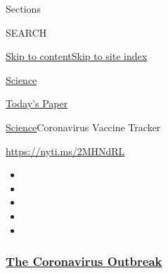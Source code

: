 Sections

SEARCH

\protect\hyperlink{site-content}{Skip to
content}\protect\hyperlink{site-index}{Skip to site index}

\href{https://www.nytimes3xbfgragh.onion/section/science}{Science}

\href{https://myaccount.nytimes3xbfgragh.onion/auth/login?response_type=cookie\&client_id=vi}{}

\href{https://www.nytimes3xbfgragh.onion/section/todayspaper}{Today's
Paper}

\href{/section/science}{Science}\textbar{}Coronavirus Vaccine Tracker

\url{https://nyti.ms/2MHNdRL}

\begin{itemize}
\item
\item
\item
\item
\item
\end{itemize}

\hypertarget{the-coronavirus-outbreak}{%
\subsubsection{\texorpdfstring{\href{https://www.nytimes3xbfgragh.onion/news-event/coronavirus?name=styln-coronavirus-national\&region=TOP_BANNER\&block=storyline_menu_recirc\&action=click\&pgtype=Interactive\&impression_id=3faa8730-efb9-11ea-b2ff-0fe24421eae6\&variant=undefined}{The
Coronavirus
Outbreak}}{The Coronavirus Outbreak}}\label{the-coronavirus-outbreak}}

